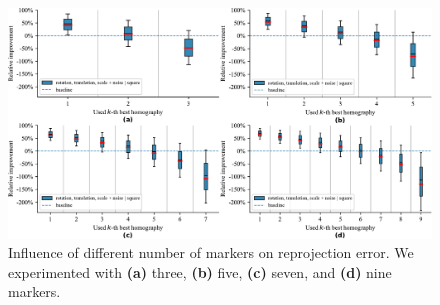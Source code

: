 \begin{figure}[t]
    \centering
    \includegraphics[width=\linewidth]{figures/homography/n_markers_influence.pdf}
    \caption{Influence of different number of markers on reprojection error. We experimented with \textbf{(a)} three, \textbf{(b)} five, \textbf{(c)} seven, and \textbf{(d)} nine markers.}
    \label{fig:NMarkersInfluence}
\end{figure}

